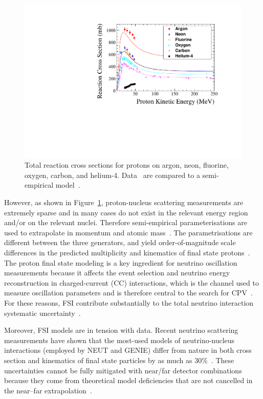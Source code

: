 \begin{figure}%
    \centering
    \includegraphics[width=12cm]{files/Figures/DataProtonCrossSections.pdf}%
    \caption{Total reaction cross sections for protons on argon, neon, fluorine, oxygen, carbon, and helium-4. Data~\cite{Carlson:1996ofz} are compared to a semi-empirical model~\cite{wellisch1996total}.}
    \label{fig:DataProtonXSec}%
\end{figure}

However, as shown in Figure~\ref{fig:DataProtonXSec}, proton-nucleus scattering measurements are extremely sparse and in many cases do not exist in the relevant energy region and/or on the relevant nuclei.
Therefore semi-empirical parameterisations are used to extrapolate in momentum and atomic mass~\cite{wellisch1996total}.  
The parametrisations are different between the three generators, and yield order-of-magnitude scale differences in the predicted multiplicity and kinematics of final state protons~\cite{dune2018high}.
The proton final state modeling is a key ingredient for neutrino oscillation measurements because it affects the event selection and neutrino energy reconstruction in charged-current (CC) interactions, which is the channel used to measure oscillation parameters and is therefore central to the search for CPV~\cite{Abe:2013hdq}.
For these reasons, FSI contribute substantially to the total neutrino interaction systematic uncertainty~\cite{Abe:2019vii}. 

Moreover, FSI models are in tension with data.  
Recent neutrino scattering measurements have shown that the most-used models of neutrino-nucleus interactions (employed by NEUT and GENIE) differ from nature in both cross section and kinematics of final state particles by as much as 30\%~\cite{McFarland:2018aaa}. 
These uncertainties cannot be fully mitigated with near/far detector combinations because they come from theoretical model deficiencies that are not cancelled in the near–far extrapolation~\cite{Coloma:2013rqa}. 

